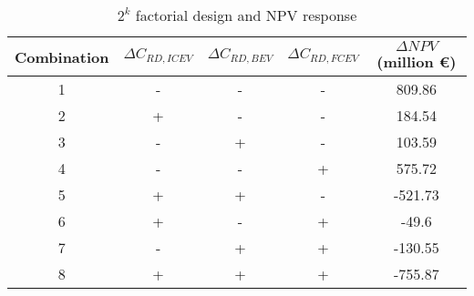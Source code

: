 \begin{table}[h]
\centering
\begin{tabular}{cccc|c}
\toprule
Combination &$\Delta C_{RD, ICEV}$&$\Delta C_{RD, BEV}$&$\Delta C_{RD, FCEV}$& $\Delta NPV$(million €)\\
\midrule
1&-&-&-&809.86\\
2&+&-&-&184.54\\
3&-&+&-&103.59\\
4&-&-&+&575.72\\
5&+&+&-&-521.73\\
6&+&-&+&-49.6\\
7&-&+&+&-130.55\\
8&+&+&+&-755.87\\
\bottomrule
\end{tabular}
\caption{$2^k$ factorial design and \gls{NPV} response}\label{tab:2k design}
\end{table}

